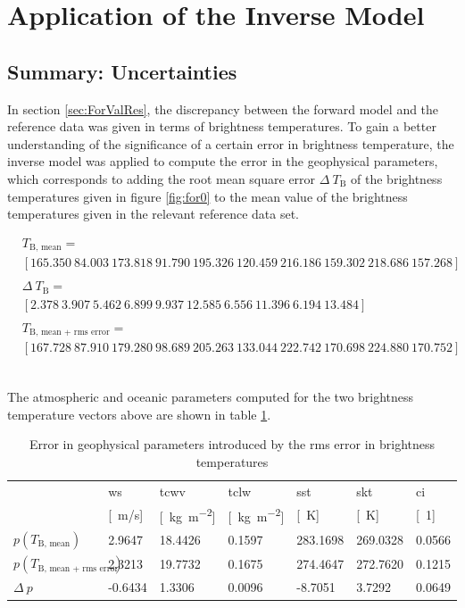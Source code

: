 \documentclass[11pt, a4paper]{article}
\begin{document}
\clearpage
\section{Application of the Inverse Model}

\subsection{Summary: Uncertainties}

In section \ref{sec:ForValRes}, the discrepancy between the forward model and the reference data was given in terms of brightness temperatures. To gain a better understanding of the significance of a certain error in brightness temperature, the inverse model was applied to compute the error in the geophysical parameters, which corresponds to adding the root mean square error \(\Delta \ T_\text{B}\) of the brightness temperatures given in figure \ref{fig:for0} to the mean value of the brightness temperatures given in the relevant reference data set.

\begin{align*}
& T_\text{B, mean} =  \\
& [ 165.350 \ 84.003 \ 173.818 \ 91.790 \ 195.326 \ 120.459 \ 216.186 \ 159.302 \ 218.686 \ 157.268 ] \\ \\
& \Delta \ T_\text{B} =  \\
& [ 2.378 \ 3.907 \ 5.462 \ 6.899 \ 9.937 \ 12.585 \ 6.556 \ 11.396 \ 6.194 \ 13.484 ] \\ \\
& T_\text{B, mean + rms error} = \\
& [ 167.728 \ 87.910 \ 179.280 \ 98.689 \ 205.263 \ 133.044 \ 222.742 \ 170.698 \ 224.880 \ 170.752]
\end{align*}

\ \\
The atmospheric and oceanic parameters computed for the two brightness temperature vectors above are shown in table \ref{tab:perror}.

\begin{table}[h!]
\centering
\begin{tabular}{@{} l l l l l l l @{}} \tabularnewline
& ws & tcwv & tclw & sst & skt & ci \\
& [\SI{}{m/s}] & [\SI{}{kg\per\square\meter}] & [\SI{}{kg\per\square\meter}] & [\SI{}{K}] & [\SI{}{K}] & [\SI{}{1}] \tabularnewline
\midrule
\(p(T_\text{B, mean})\) & 2.9647 & 18.4426 & 0.1597 & 283.1698 & 269.0328 & 0.0566 \\
\(p(T_\text{B, mean + rms error})\) & 2.3213 & 19.7732 & 0.1675 & 274.4647 & 272.7620 & 0.1215 \\
\(\Delta \ p\) & -0.6434 & 1.3306 & 0.0096 & -8.7051 & 3.7292 & 0.0649
\end{tabular}
\caption{Error in geophysical parameters introduced by the rms error in brightness temperatures}
\label{tab:perror}
\end{table}
\end{document}
